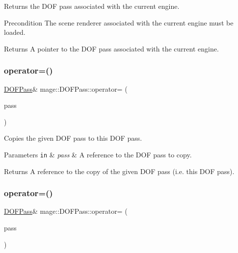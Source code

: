 Returns the D\+OF pass associated with the current engine.

\begin{DoxyPrecond}{Precondition}
The scene renderer associated with the current engine must be loaded. 
\end{DoxyPrecond}
\begin{DoxyReturn}{Returns}
A pointer to the D\+OF pass associated with the current engine. 
\end{DoxyReturn}
\hypertarget{classmage_1_1_d_o_f_pass_a692f9193e68b26b8643cae4075af658b}{}\label{classmage_1_1_d_o_f_pass_a692f9193e68b26b8643cae4075af658b} 
\subsubsection{\texorpdfstring{operator=()}{operator=()}\hspace{0.1cm}{\footnotesize\ttfamily [1/2]}}
{\footnotesize\ttfamily \hyperlink{classmage_1_1_d_o_f_pass}{D\+O\+F\+Pass}\& mage\+::\+D\+O\+F\+Pass\+::operator= (\begin{DoxyParamCaption}\item[{const \hyperlink{classmage_1_1_d_o_f_pass}{D\+O\+F\+Pass} \&}]{pass }\end{DoxyParamCaption})\hspace{0.3cm}{\ttfamily [delete]}}

Copies the given D\+OF pass to this D\+OF pass.


\begin{DoxyParams}[1]{Parameters}
\mbox{\tt in}  & {\em pass} & A reference to the D\+OF pass to copy. \\
\hline
\end{DoxyParams}
\begin{DoxyReturn}{Returns}
A reference to the copy of the given D\+OF pass (i.\+e. this D\+OF pass). 
\end{DoxyReturn}
\hypertarget{classmage_1_1_d_o_f_pass_a153afdafbeb6542cee6f8bc98672e6cc}{}\label{classmage_1_1_d_o_f_pass_a153afdafbeb6542cee6f8bc98672e6cc} 
\subsubsection{\texorpdfstring{operator=()}{operator=()}\hspace{0.1cm}{\footnotesize\ttfamily [2/2]}}
{\footnotesize\ttfamily \hyperlink{classmage_1_1_d_o_f_pass}{D\+O\+F\+Pass}\& mage\+::\+D\+O\+F\+Pass\+::operator= (\begin{DoxyParamCaption}\item[{\hyperlink{classmage_1_1_d_o_f_pass}{D\+O\+F\+Pass} \&\&}]{pass }\end{DoxyParamCaption})\hspace{0.3cm}{\ttfamily [delete]}}


